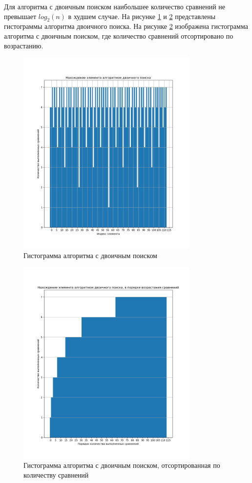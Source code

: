 \clearpage


Для алгоритма с двоичным поиском наибольшее количество сравнений не превышает
$log_2(n)$ в худшем случае. На рисунке
\ref{fig:images-Figure_2} и \ref{fig:images-Figure_3} представлены гистограммы алгоритма
двоичного поиска. На рисунке \ref{fig:images-Figure_3} изображена
гистограмма алгоритма с двоичным поиском, где количество сравнений
отсортировано по возрастанию.
\begin{figure}[h]
    \centering
    \includegraphics[width=0.8\textwidth]{images/Figure_2}
    \caption{Гистограмма алгоритма с двоичным поиском}
    \label{fig:images-Figure_2}
\end{figure}

\clearpage
\begin{figure}[h]
    \centering
    \includegraphics[width=0.8\textwidth]{images/Figure_3}
    \caption{Гистограмма алгоритма с двоичным поиском, отсортированная по количеству сравнений}
    \label{fig:images-Figure_3}
\end{figure}

